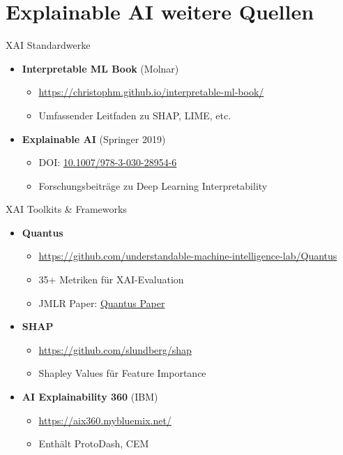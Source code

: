 \documentclass[aspectratio=1610, xcolor=dvipsnames, 9pt]{beamer}
\begin{document}
\section{Explainable AI weitere Quellen}

\begin{frame}{XAI Standardwerke}
  \begin{itemize}
    \item \textbf{Interpretable ML Book} (Molnar)
    \begin{itemize}
      \item \url{https://christophm.github.io/interpretable-ml-book/}
      \item Umfassender Leitfaden zu SHAP, LIME, etc.
    \end{itemize}
    \item \textbf{Explainable AI} (Springer 2019)
    \begin{itemize}
      \item DOI: \href{https://doi.org/10.1007/978-3-030-28954-6}{10.1007/978-3-030-28954-6}
      \item Forschungsbeiträge zu Deep Learning Interpretability
    \end{itemize}
  \end{itemize}
\end{frame}

\begin{frame}{XAI Toolkits \& Frameworks}
  \begin{itemize}
    \item \textbf{Quantus}
    \begin{itemize}
      \item \url{https://github.com/understandable-machine-intelligence-lab/Quantus}
      \item 35+ Metriken für XAI-Evaluation
      \item JMLR Paper: \href{https://www.jmlr.org/papers/v24/22-0142.html}{Quantus Paper}
    \end{itemize}
    \item \textbf{SHAP}
    \begin{itemize}
      \item \url{https://github.com/slundberg/shap}
      \item Shapley Values für Feature Importance
    \end{itemize}
    \item \textbf{AI Explainability 360} (IBM)
    \begin{itemize}
      \item \url{https://aix360.mybluemix.net/}
      \item Enthält ProtoDash, CEM
    \end{itemize}
  \end{itemize}
\end{frame}
\end{document}
